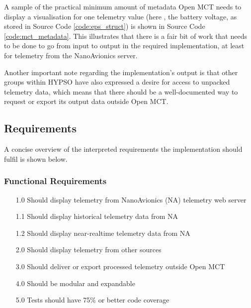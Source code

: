 \begin{code}
\inputminted[linenos=true,breaklines=true,bgcolor=codebg]{javascript}{./Code/telemetry_metadata_sample.json}
\label{code:mct_metadata}
\end{code}

A sample of the practical minimum amount of metadata Open MCT needs to display a visualisation for one telemetry value (here , the battery voltage, as stored in Source Code \ref{code:eps_struct}) is shown in Source Code \ref{code:mct_metadata}. This illustrates that there is a fair bit of work that needs to be done to go from input to output in the required implementation, at least for telemetry from the NanoAvionics server.

Another important note regarding the implementation's output is that other groups within HYPSO have also expressed a desire for access to unpacked telemetry data, which means that there should be a well-documented way to request or export its output data outside Open MCT.

\subsection{Requirements}
A concise overview of the interpreted requirements the implementation should fulfil is shown below.

\subsubsection{Functional Requirements}
\begin{enumerate}
  \item[1.0] Should display telemetry from NanoAvionics (NA) telemetry web server
  \item[1.1] Should display historical telemetry data from NA
  \item[1.2] Should display near-realtime telemetry data from NA
  \item[2.0] Should display telemetry from other sources
  \item[3.0] Should deliver or export processed telemetry outside Open MCT
  \item[4.0] Should be modular and expandable
  \item[5.0] Tests should have 75\% or better code coverage
\end{enumerate}

